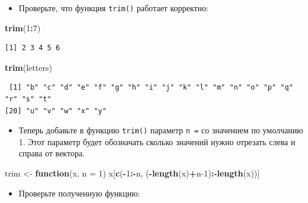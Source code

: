 \documentclass[
]{book}
\newenvironment{Shaded}{\begin{snugshade}}{\end{snugshade}}
\newcommand{\ControlFlowTok}[1]{\textcolor[rgb]{0.13,0.29,0.53}{\textbf{#1}}}
\newcommand{\DataTypeTok}[1]{\textcolor[rgb]{0.13,0.29,0.53}{#1}}
\newcommand{\DecValTok}[1]{\textcolor[rgb]{0.00,0.00,0.81}{#1}}
\newcommand{\KeywordTok}[1]{\textcolor[rgb]{0.13,0.29,0.53}{\textbf{#1}}}
\newcommand{\NormalTok}[1]{#1}
\newcommand{\OperatorTok}[1]{\textcolor[rgb]{0.81,0.36,0.00}{\textbf{#1}}}
\newcommand{\StringTok}[1]{\textcolor[rgb]{0.31,0.60,0.02}{#1}}
\providecommand{\tightlist}{%
  \setlength{\itemsep}{0pt}\setlength{\parskip}{0pt}}
\begin{document}
\begin{itemize}
\tightlist
\item
  Проверьте, что функция \texttt{trim()} работает корректно:
\end{itemize}

\begin{Shaded}
\begin{Highlighting}[]
\KeywordTok{trim}\NormalTok{(}\DecValTok{1}\OperatorTok{:}\DecValTok{7}\NormalTok{)}
\end{Highlighting}
\end{Shaded}

\begin{verbatim}
[1] 2 3 4 5 6
\end{verbatim}

\begin{Shaded}
\begin{Highlighting}[]
\KeywordTok{trim}\NormalTok{(letters)}
\end{Highlighting}
\end{Shaded}

\begin{verbatim}
 [1] "b" "c" "d" "e" "f" "g" "h" "i" "j" "k" "l" "m" "n" "o" "p" "q" "r" "s" "t"
[20] "u" "v" "w" "x" "y"
\end{verbatim}

\begin{itemize}
\tightlist
\item
  Теперь добавьте в функцию \texttt{trim()} параметр \texttt{n\ =} со значением по умолчанию 1. Этот параметр будет обозначать сколько значений нужно отрезать слева и справа от вектора.
\end{itemize}

\begin{Shaded}
\begin{Highlighting}[]
\NormalTok{trim <-}\StringTok{ }\ControlFlowTok{function}\NormalTok{(x, }\DataTypeTok{n =} \DecValTok{1}\NormalTok{) x[}\KeywordTok{c}\NormalTok{(}\OperatorTok{-}\DecValTok{1}\OperatorTok{:-}\NormalTok{n, (}\OperatorTok{-}\KeywordTok{length}\NormalTok{(x)}\OperatorTok{+}\NormalTok{n}\DecValTok{-1}\NormalTok{)}\OperatorTok{:-}\KeywordTok{length}\NormalTok{(x))]}
\end{Highlighting}
\end{Shaded}

\begin{itemize}
\tightlist
\item
  Проверьте полученную функцию:
\end{itemize}
\end{document}
